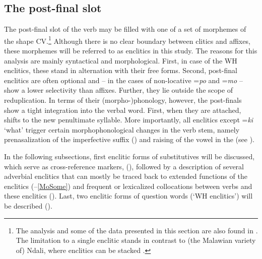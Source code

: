\subsection{The post-final slot}
\label{PostfinalClitics}
The post-final slot of the verb may be filled with one of a set of morphemes of the shape CV.\footnote{The analysis and some of the data presented in this section are also found in \citet{PersohnB2017a}. The limitation to a single enclitic stands in contrast to (the Malawian variety of) Ndali, where enclitics can be stacked \citep[92]{BotneR2008}.} Although there is no clear boundary between clitics and affixes, these morphemes will be referred to as enclitics in this study. The reasons for this analysis are mainly syntactical and morphological. First, in case of the WH enclitics, these stand in alternation with their free forms. Second, post-final enclitics are often optional and -- in the cases of non-locative =\textit{po} and \mbox{=\textit{mo}} -- show a lower selectivity than affixes. Further, they lie outside the scope of  reduplication. In terms of their (morpho-)phonology, however, the post-finals show a tight integration into the verbal word. First, when they are attached,  shifts to the new penultimate syllable. More importantly, all enclitics except =\textit{ki} `what' trigger certain morphophonological changes in the verb stem, namely prenasalization of the imperfective suffix () and raising of the vowel in the  (see ).

In the following subsections, first enclitic forms of  substitutives will be discussed, which serve as  cross-reference markers,  (), followed by a description of several adverbial enclitics that can mostly be traced back to extended functions of the  enclitics (--\ref{MoSome}) and frequent or lexicalized collocations between verbs and these enclitics (). Last, two enclitic forms of question words (\lq WH enclitics') will be described ().

